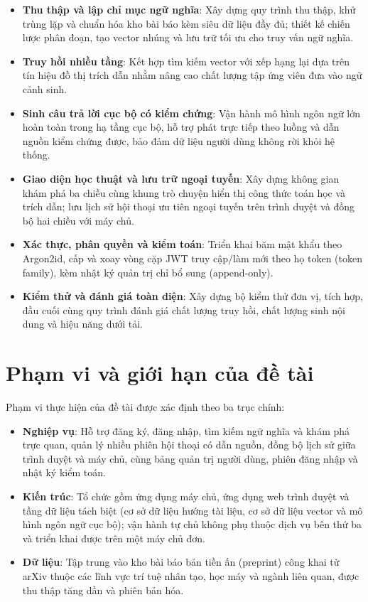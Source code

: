 \begin{itemize}
  \item[--] \textbf{Thu thập và lập chỉ mục ngữ nghĩa}: Xây dựng quy trình thu thập, khử trùng lặp và chuẩn hóa kho bài báo kèm siêu dữ liệu đầy đủ; thiết kế chiến lược phân đoạn, tạo vector nhúng và lưu trữ tối ưu cho truy vấn ngữ nghĩa.
  \item[--] \textbf{Truy hồi nhiều tầng}: Kết hợp tìm kiếm vector với xếp hạng lại dựa trên tín hiệu đồ thị trích dẫn nhằm nâng cao chất lượng tập ứng viên đưa vào ngữ cảnh sinh.
  \item[--] \textbf{Sinh câu trả lời cục bộ có kiểm chứng}: Vận hành mô hình ngôn ngữ lớn hoàn toàn trong hạ tầng cục bộ, hỗ trợ phát trực tiếp theo luồng và dẫn nguồn kiểm chứng được, bảo đảm dữ liệu người dùng không rời khỏi hệ thống.
  \item[--] \textbf{Giao diện học thuật và lưu trữ ngoại tuyến}: Xây dựng không gian khám phá ba chiều cùng khung trò chuyện hiển thị công thức toán học và trích dẫn; lưu lịch sử hội thoại ưu tiên ngoại tuyến trên trình duyệt và đồng bộ hai chiều với máy chủ.
  \item[--] \textbf{Xác thực, phân quyền và kiểm toán}: Triển khai băm mật khẩu theo Argon2id, cấp và xoay vòng cặp JWT truy cập/làm mới theo họ token (token family), kèm nhật ký quản trị chỉ bổ sung (append-only).
  \item[--] \textbf{Kiểm thử và đánh giá toàn diện}: Xây dựng bộ kiểm thử đơn vị, tích hợp, đầu cuối cùng quy trình đánh giá chất lượng truy hồi, chất lượng sinh nội dung và hiệu năng dưới tải.
\end{itemize}

\section{Phạm vi và giới hạn của đề tài}
\label{sec:pham-vi-gioi-han}

Phạm vi thực hiện của đề tài được xác định theo ba trục chính:

\begin{itemize}
  \item[--] \textbf{Nghiệp vụ}: Hỗ trợ đăng ký, đăng nhập, tìm kiếm ngữ nghĩa và khám phá trực quan, quản lý nhiều phiên hội thoại có dẫn nguồn, đồng bộ lịch sử giữa trình duyệt và máy chủ, cùng bảng quản trị người dùng, phiên đăng nhập và nhật ký kiểm toán.
  \item[--] \textbf{Kiến trúc}: Tổ chức gồm ứng dụng máy chủ, ứng dụng web trình duyệt và tầng dữ liệu tách biệt (cơ sở dữ liệu hướng tài liệu, cơ sở dữ liệu vector và mô hình ngôn ngữ cục bộ); vận hành tự chủ không phụ thuộc dịch vụ bên thứ ba và triển khai được trên một máy chủ đơn.
  \item[--] \textbf{Dữ liệu}: Tập trung vào kho bài báo bản tiền ấn (preprint) công khai từ arXiv thuộc các lĩnh vực trí tuệ nhân tạo, học máy và ngành liên quan, được thu thập tăng dần và phiên bản hóa.
\end{itemize}

